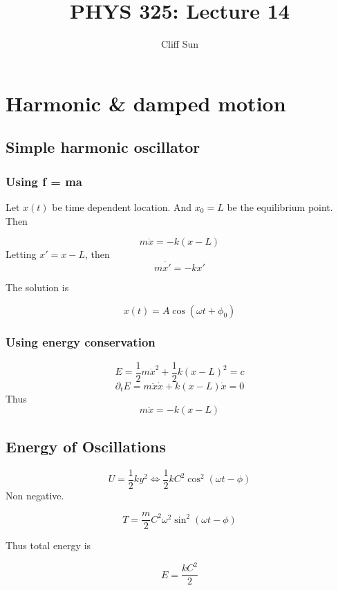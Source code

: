 \documentclass{article}
\title{PHYS 325: Lecture 14}
\author{Cliff Sun}
\newtheorem{one minute paper}[theorem]{One Minute Paper}
\begin{document}
\maketitle

\section*{Harmonic \& damped motion}

\subsection*{Simple harmonic oscillator}

\subsubsection*{Using f = ma}

Let $x(t)$ be time dependent location. And $x_0 = L$ be the equilibrium point. Then 

\begin{equation}
    m\ddot{x} = -k(x-L)
\end{equation}
Letting $x' = x - L$, then 
\begin{equation}
    m\ddot{x'} = -kx'
\end{equation}

The solution is 

\begin{equation}
    x(t) = A\cos(\omega t + \phi_0)
\end{equation}

\subsubsection*{Using energy conservation}

\begin{equation}
    E = \frac{1}{2}m\dot{x}^2 + \frac{1}{2}k(x-L)^2 = c
\end{equation}
\begin{equation}
    \partial_t E = m\ddot{x}\dot{x} + k(x-L)\dot{x} = 0
\end{equation}
Thus 
\begin{equation}
    m\ddot{x} = -k(x-L)
\end{equation}

\subsection*{Energy of Oscillations}

\begin{equation}
    U = \frac{1}{2}ky^2 \iff \frac{1}{2}kC^2\cos^2(\omega t - \phi)
\end{equation}
Non negative.

\begin{equation}
    T = \frac{m}{2}C^2\omega^2\sin^2(\omega t - \phi)
\end{equation}

Thus total energy is 

\begin{equation}
    E = \frac{kC^2}{2}
\end{equation}
\end{document}
